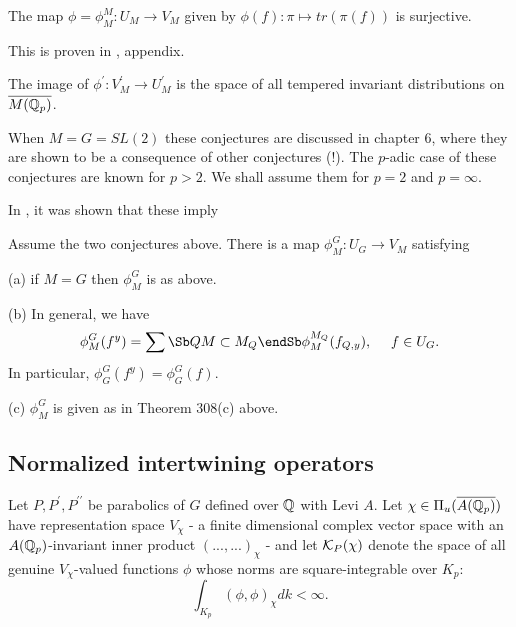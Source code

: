 \begin{conjecture}
The map $\phi =\phi_M^M :U_M\rightarrow V_M$ given by
$\phi (f):\pi \longmapsto tr(\pi (f)) $ is surjective.
\end{conjecture}

This is proven in \cite{A16}, appendix.

\begin{conjecture}
The image of $\phi ^{\prime }:V_M^{\prime }\rightarrow U_M^{\prime }$ is the
space of all tempered invariant distributions on
$\overline{M({\Bbb{Q}}_p)}$.
\end{conjecture}

When $M=G=SL(2)$ these conjectures are discussed in chapter 6, where
they are shown to be a consequence of other conjectures (!).
The $p$-adic case of these conjectures are known for
$p>2$. We shall assume them for $p=2$ and $p=\infty$.


In \cite{A6}, it was shown that these imply
\begin{theorem} Assume the two conjectures above.
There is a map
$\phi^G_M :U_G\rightarrow V_M$ satisfying

(a) if $M=G$ then $\phi_M^G$ is as above.

(b) In general, we have
\[
\phi_M^G(f^y)=
\sum\Sb Q \\ M\subset M_Q\endSb
\phi_M^{M_Q}(f_{Q,y}),\ \ \ \ f\in U_G.
\]
In particular, $\phi_G^G(f^y)=\phi_G^G(f)$.

(c) $\phi_M^G$ is given as in Theorem 308(c) above.
\end{theorem}

\subsection{Normalized intertwining operators}

Let $P,P^{\prime },P^{\prime \prime }$ be parabolics of
$G$ defined over ${\Bbb{Q}}$
with Levi $A$. Let $\chi \in \Pi _u({\overline{A({\Bbb{Q}}_p)}})$ have
representation space $V_\chi $ - a finite dimensional complex vector space
with an ${A({\Bbb {Q}}_p)}$-invariant inner product
$(...,...)_\chi $ - and let ${\cal{K}}_P(\chi )$ denote the space of all
genuine $V_\chi $-valued functions $\phi $
whose norms are square-integrable over
${K_p}$: 
\[
\int_{K_p}(\phi ,\phi )_\chi dk<\infty . 
\]

